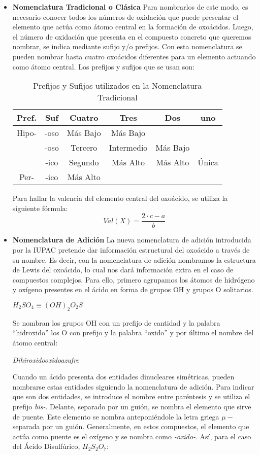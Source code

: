 \begin{itemize}
	\item \textbf{Nomenclatura Tradicional o Clásica} Para nombrarlos de este modo, es necesario conocer todos los números de oxidación que
	puede presentar el elemento que actúa como átomo central en la formación de oxoácidos.
	Luego, el número de oxidación que presenta en el compuesto concreto que queremos
	nombrar, se indica mediante sufijo y/o prefijos. Con esta nomenclatura se pueden nombrar hasta cuatro oxoácidos diferentes para un elemento actuando como átomo central. Los prefijos y sufijos que se usan son:\\
	\begin{table} [h!]
		\centering
		\begin{tabular}{c|c||c|c|c|c} \hline
			Pref.&Suf&Cuatro&Tres&Dos&uno\\ \hline
			Hipo-&-oso&Más Bajo&Más Bajo&&\\ \hline
			&-oso&Tercero&Intermedio&Más Bajo&\\ \hline
			&-ico&Segundo&Más Alto&Más Alto&Única\\ \hline
			Per-&-ico&Más Alto&&&\\ \hline
		\end{tabular}
		\caption{Prefijos y Sufijos utilizados en la Nomenclatura Tradicional}
	\end{table}
	Para hallar la valencia del elemento central del oxoácido, se utiliza la siguiente fórmula:
	\begin{equation}
		Val(X)=\frac{2\cdot c-a}{b}
	\end{equation}
	\item \textbf{Nomenclatura de Adición} La nueva nomenclatura de adición introducida por la IUPAC pretende dar información estructural del oxoácido a través de su nombre. Es decir, con la nomenclatura de adición nombramos la estructura de Lewis del oxoácido, lo cual nos dará información extra en el caso de compuestos complejos. Para ello, primero agrupamos los átomos de hidrógeno y oxígeno presentes en el ácido en forma de grupos OH y grupos O solitarios.
	\begin{center}
		$H_{2}SO_{4}  \equiv (OH)_{2}O_{2}S$
	\end{center}
	Se nombran los grupos OH con un prefijo de cantidad y la palabra “hidroxido” los O con prefijo y la palabra “oxido” y por último el nombre del átomo central:
	\begin{center}
		\textit{Dihiroxidooxidoazufre}
	\end{center}
	Cuando un ácido presenta dos entidades dinucleares simétricas, pueden nombrarse estas entidades siguiendo la nomenclatura de adición. Para indicar que son dos entidades, se introduce el nombre entre paréntesis y se utiliza el prefijo \emph{bis-}. Delante, separado por un guión, se nombra el elemento que sirve de puente. Este elemento se nombra anteponiéndole la letra griega \emph{$\mu -$} separada por un guión. Generalmente, en estos compuestos, el elemento que actúa como puente es el oxígeno y se nombra como \emph{-oxido-}. Así, para el caso del Ácido Disulfúrico, $H_{2}S_{2}O_{7}$:

\end{itemize}
